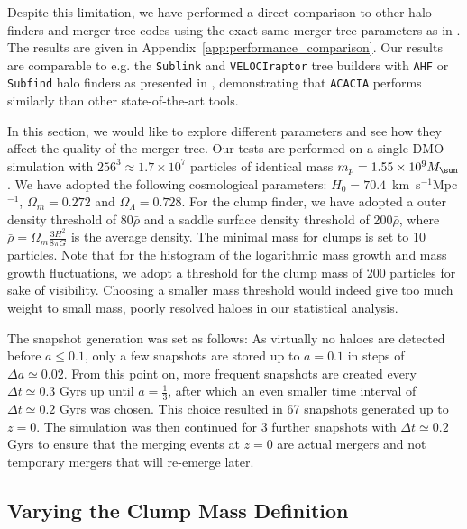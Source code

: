 Despite this limitation, we have performed a direct comparison to
other halo finders and merger tree codes using the exact same merger
tree parameters as in \citet{SUSSING_HALOFINDER}. The results are
given in Appendix~\ref{app:performance_comparison}.  Our results are
comparable to e.g. the \texttt{Sublink} and \texttt{VELOCIraptor} tree
builders with \texttt{AHF} or \texttt{Subfind} halo finders as
presented in \citet{SUSSING_HALOFINDER}, demonstrating that
\texttt{ACACIA} performs similarly than other state-of-the-art tools.

In this section, we would like to explore different parameters and see
how they affect the quality of the merger tree.  Our tests are
performed on a single DMO simulation with $256^3 \approx 1.7\times
10^7$ particles of identical mass $m_p = 1.55\times 10^9\msol$.  We
have adopted the following cosmological parameters: $H_0 =
70.4$~km~s$^{-1}$Mpc$^{-1}$, $\Omega_m = 0.272$ and $\Omega_\Lambda =
0.728$.  For the clump finder, we have adopted a outer density
threshold of 80$\bar\rho$ and a saddle surface density threshold of
200$\bar\rho$, where $\bar\rho = \Omega_m \frac{3 H^2}{8 \pi G}$ is
the average density.  The minimal mass for clumps is set to 10
particles. Note that for the histogram of the logarithmic mass growth
and mass growth fluctuations, we adopt a threshold for the clump mass
of 200 particles for sake of visibility. Choosing a smaller mass
threshold would indeed give too much weight to small mass, poorly
resolved haloes in our statistical analysis.

The snapshot generation was set as follows: As virtually no haloes are
detected before $a\leq 0.1$, only a few snapshots are stored up to
$a=0.1$ in steps of $\Delta a \simeq 0.02$.  From this point on, more
frequent snapshots are created every $\Delta t \simeq 0.3$ Gyrs up
until $a = \tfrac{1}{3}$, after which an even smaller time interval of
$\Delta t \simeq 0.2$ Gyrs was chosen.  This choice resulted in 67
snapshots generated up to $z = 0$.  The simulation was then continued
for 3 further snapshots with $\Delta t \simeq 0.2$ Gyrs to ensure that
the merging events at $z = 0$ are actual mergers and not temporary
mergers that will re-emerge later.

\subsection{Varying the Clump Mass Definition}

